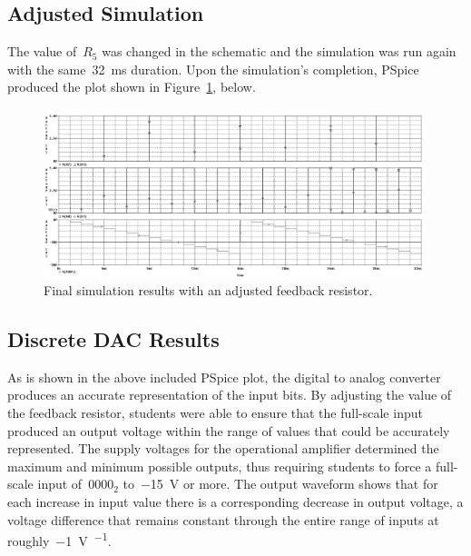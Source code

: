 \subsection{Adjusted Simulation}
The value of~$R_5$ was changed in the schematic and the simulation was run
again with the same~\SI{32}{\milli\second} duration.  Upon the simulation's
completion, PSpice produced the plot shown in Figure~\ref{f:dac_plot2}, below.
%
\begin{figure}[H]
\centering
	\includegraphics[width=.8\textwidth]{img/plot/part1_plot2b.PNG}
	\parbox{.8\textwidth}{
	\caption[Discrete DAC --- Tuned Results]{Final simulation results with an
	adjusted feedback resistor.}
	\label{f:dac_plot2}}
\end{figure}

\subsection{Discrete DAC Results}
As is shown in the above included PSpice plot, the digital to analog converter
produces an accurate representation of the input bits.  By adjusting the value
of the feedback resistor, students were able to ensure that the full-scale
input produced an output voltage within the range of values that could be
accurately represented.  The supply voltages for the operational amplifier
determined the maximum and minimum possible outputs, thus requiring students to
force a full-scale input of~$0000_2$ to~\SI{-15}{\volt} or more.  The output
waveform shows that for each increase in input value there is a corresponding
decrease in output voltage, a voltage difference that remains constant through
the entire range of inputs at roughly~\SI{-1}{\volt\per\bit}.
